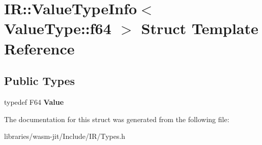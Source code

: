 \hypertarget{struct_i_r_1_1_value_type_info_3_01_value_type_1_1f64_01_4}{}\section{IR\+:\+:Value\+Type\+Info$<$ Value\+Type\+:\+:f64 $>$ Struct Template Reference}
\label{struct_i_r_1_1_value_type_info_3_01_value_type_1_1f64_01_4}
\subsection*{Public Types}
\begin{DoxyCompactItemize}
\item 
\mbox{\label{struct_i_r_1_1_value_type_info_3_01_value_type_1_1f64_01_4_a5a8256741b18d4f0e4bca0d2fb23daae}} 
typedef F64 {\bfseries Value}
\end{DoxyCompactItemize}


The documentation for this struct was generated from the following file\+:\begin{DoxyCompactItemize}
\item 
libraries/wasm-\/jit/\+Include/\+I\+R/Types.\+h\end{DoxyCompactItemize}
